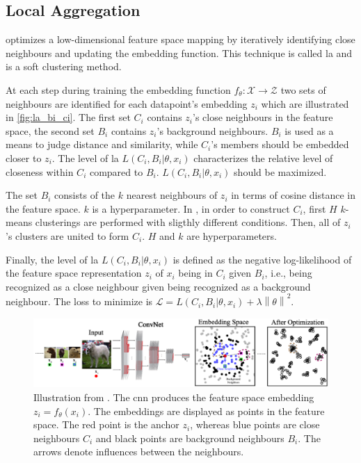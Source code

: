 \subsection{Local Aggregation}\label{subsec:local_aggregation}

\citet{local_aggr_2019} optimizes a low-dimensional feature space mapping by 
iteratively identifying close neighbours and updating the embedding function.
This technique is called \ac{la} and is a soft clustering method.

At each step during training the embedding function $f_\theta: \mathcal{X} \rightarrow \mathcal{Z}$ 
two sets of neighbours are identified for each datapoint's embedding $z_i$ 
which are illustrated in \autoref{fig:la_bi_ci}.
The first set $C_i$ contains $z_i$'s close neighbours in the feature space,
the second set $B_i$ contains $z_i$'s background neighbours.
$B_i$ is used as a means to judge distance and similarity, 
while $C_i$'s members should be embedded closer to $z_i$.
The level of \ac{la} $L(C_i,B_i | \theta, x_i)$ 
characterizes the relative level of closeness within $C_i$ compared to $B_i$.
$L(C_i,B_i | \theta, x_i)$ should be maximized.

The set $B_i$ consists of the $k$ nearest neighbours of $z_i$ in terms of cosine distance 
in the feature space.
$k$ is a hyperparameter.
In \citet{local_aggr_2019}, in order to construct $C_i$, 
first $H$ $k$-means clusterings are performed with sligthly different conditions.
Then, all of $z_i$'s clusters are united to form $C_i$.
$H$ and $k$ are hyperparameters.

Finally, the level of \ac{la} $L(C_i,B_i | \theta, x_i)$ is defined as the negative log-likelihood 
of the feature space representation $z_i$ of $x_i$ being in $C_i$ given $B_i$, 
i.e., being recognized as a close neighbour given being recognized as a background neighbour.
The loss to minimize is $\mathcal{L} = L(C_i,B_i | \theta, x_i) + \lambda \left\| \theta \right\|^2$.

\begin{figure}[h] %
    \centering
    \includegraphics[width=360pt]{images/la_neighbourhoods.png}
    \caption{Illustration from \citet{local_aggr_2019}.
    The \ac{cnn} produces the feature space embedding $z_i = f_\theta(x_i)$.
    The embeddings are displayed as points in the feature space.
    The red point is the anchor $z_i$, 
    whereas blue points are close neighbours $C_i$ and
    black points are background neighbours $B_i$.
    The arrows denote influences between the neighbours.}
    \label{fig:la_bi_ci}
\end{figure}